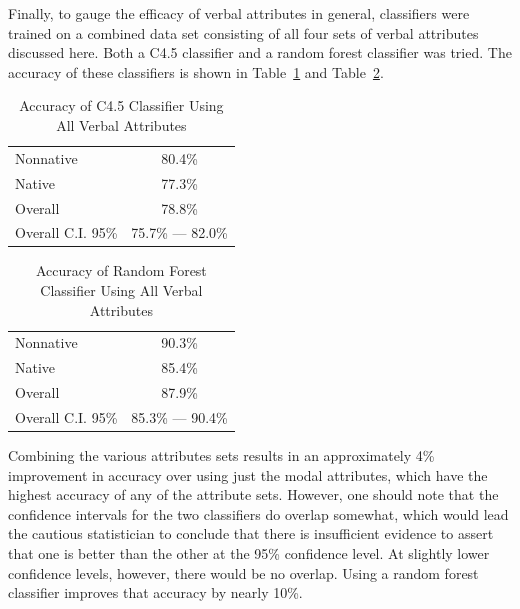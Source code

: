 \documentclass[main.tex]{subfiles}
\begin{document}
Finally, to gauge the efficacy of verbal attributes in general, classifiers were trained on a combined data set consisting of all four sets of verbal attributes discussed here. Both a C4.5 classifier and a random forest classifier was tried. The accuracy of these classifiers is shown in Table~\ref{table:c45-combined-results} and Table~\ref{table:combined-results}.
\begin{table}[htbp]
\centering
\caption{Accuracy of C4.5 Classifier Using All Verbal Attributes}
\begin{tabular}{l c}
\toprule
Nonnative & 80.4\% \\
Native & 77.3\% \\
Overall & 78.8\% \\
Overall C.I. 95\% & 75.7\% --- 82.0\%\\
\bottomrule
\end{tabular}
\label{table:c45-combined-results}
\end{table}
\begin{table}[htbp]
\centering
\caption{Accuracy of Random Forest Classifier Using All Verbal Attributes}
\begin{tabular}{l c}
\toprule
Nonnative & 90.3\% \\
Native & 85.4\% \\
Overall & 87.9\% \\
Overall C.I. 95\% & 85.3\% --- 90.4\%\\
\bottomrule
\end{tabular}
\label{table:combined-results}
\end{table}
Combining the various attributes sets results in an approximately 4\% improvement in accuracy over using just the modal attributes, which have the highest accuracy of any of the attribute sets. However, one should note that the confidence intervals for the two classifiers do overlap somewhat, which would lead the cautious statistician to conclude that there is insufficient evidence to assert that one is better than the other at the 95\% confidence level. At slightly lower confidence levels, however, there would be no overlap. Using a random forest classifier improves that accuracy by nearly 10\%.
\biblio
\end{document}
